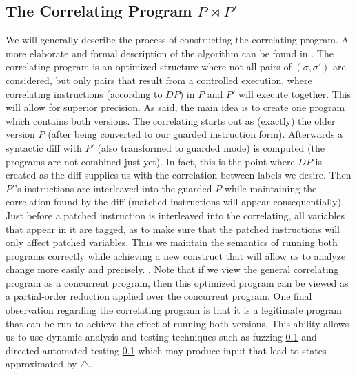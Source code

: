 \subsection{The Correlating Program $P \bowtie P'$ }
We will generally describe the process of constructing the correlating program. A more elaborate and formal description of the algorithm can be found in . The correlating program is an optimized structure where not all pairs of $(\sigma,\sigma')$ are considered, but only pairs that result from a controlled execution, where correlating instructions (according to $DP$) in $P$ and $P'$ will execute together. This will allow for superior precision. As said, the main idea is to create one program which contains both versions. The correlating starts out as (exactly) the older version $P$ (after being converted to our guarded instruction form). Afterwards a syntactic diff with $P'$ (also transformed to guarded mode) is computed (the programs are not combined just yet). In fact, this is the point where $DP$ is created as the diff supplies us with the correlation between labels we desire. Then $P'$'s instructions are interleaved into the guarded $P$ while maintaining the correlation found by the diff (matched instructions will appear consequentially). Just before a patched instruction is interleaved into the correlating, all variables that appear in it are tagged, as to make sure that the patched instructions will only affect patched variables. Thus we maintain the semantics of running both programs correctly while achieving a new construct that will allow us to analyze change more easily and precisely. . Note that if we view the general correlating program as a concurrent program, then this optimized program can be viewed as a partial-order reduction applied over the concurrent program. One final observation regarding the correlating program is that it is a legitimate program that can be run to achieve the effect of running both versions. This ability allows us to use dynamic analysis and testing techniques such as fuzzing \ref{} and directed automated testing \ref{} which may produce input that lead to states approximated by $\triangle$.

